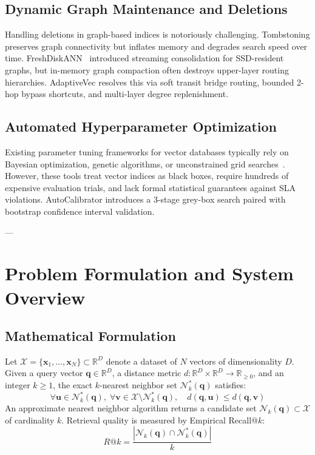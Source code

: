 \documentclass[10pt,journal,compsoc]{IEEEtran}
\begin{document}
\subsection{Dynamic Graph Maintenance and Deletions}
Handling deletions in graph-based indices is notoriously challenging. Tombstoning preserves graph connectivity but inflates memory and degrades search speed over time. FreshDiskANN~\cite{gollapudi2023freshdiskann} introduced streaming consolidation for SSD-resident graphs, but in-memory graph compaction often destroys upper-layer routing hierarchies. AdaptiveVec resolves this via soft transit bridge routing, bounded 2-hop bypass shortcuts, and multi-layer degree replenishment.

\subsection{Automated Hyperparameter Optimization}
Existing parameter tuning frameworks for vector databases typically rely on Bayesian optimization, genetic algorithms, or unconstrained grid searches~\cite{aumueller2020ann}. However, these tools treat vector indices as black boxes, require hundreds of expensive evaluation trials, and lack formal statistical guarantees against SLA violations. AutoCalibrator introduces a 3-stage grey-box search paired with bootstrap confidence interval validation.

---

\section{Problem Formulation and System Overview}
\label{sec:problem_formulation}

\subsection{Mathematical Formulation}
Let $\mathcal{X} = \{\mathbf{x}_1, \dots, \mathbf{x}_N\} \subset \mathbb{R}^D$ denote a dataset of $N$ vectors of dimensionality $D$. Given a query vector $\mathbf{q} \in \mathbb{R}^D$, a distance metric $d: \mathbb{R}^D \times \mathbb{R}^D \to \mathbb{R}_{\ge 0}$, and an integer $k \ge 1$, the exact $k$-nearest neighbor set $\mathcal{N}_k^*(\mathbf{q})$ satisfies:
\begin{equation}
\forall \mathbf{u} \in \mathcal{N}_k^*(\mathbf{q}), \; \forall \mathbf{v} \in \mathcal{X} \setminus \mathcal{N}_k^*(\mathbf{q}), \quad d(\mathbf{q}, \mathbf{u}) \le d(\mathbf{q}, \mathbf{v})
\end{equation}
An approximate nearest neighbor algorithm returns a candidate set $\mathcal{N}_k(\mathbf{q}) \subset \mathcal{X}$ of cardinality $k$. Retrieval quality is measured by Empirical Recall@$k$:
\begin{equation}
R@k = \frac{|\mathcal{N}_k(\mathbf{q}) \cap \mathcal{N}_k^*(\mathbf{q})|}{k}
\end{equation}
\end{document}

